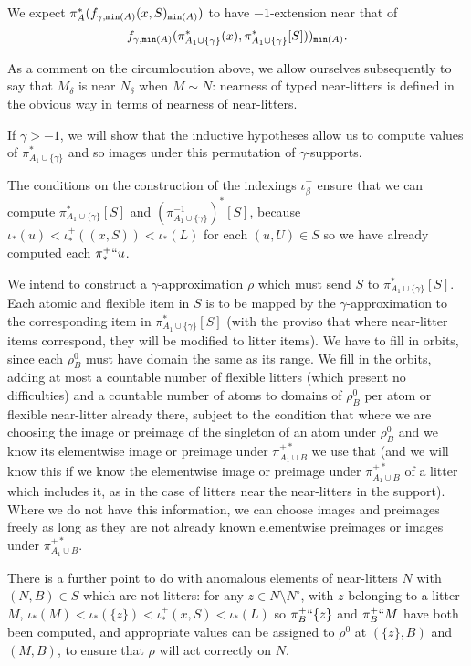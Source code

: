 \documentclass[112pt]{article}
\begin{document}
\begin{description}
We expect $\pi^*_A(f_{\gamma,{\tt min}(A)}(x,S)_{{\tt min}(A)})$ to have $-1$-extension near that of $$f_{ \gamma,{\tt min}(A)}(\pi^*_{A_1\cup \{\gamma\}}(x),\pi^*_{A_1\cup \{\gamma\}}[S]))_{{\tt min}(A)}.$$

As a comment on the circumlocution above, we allow ourselves subsequently to say that $M_\delta$ is near $N_\delta$ when $M \sim N$:  nearness of typed near-litters
is defined in the obvious way in terms of nearness of near-litters.

If $\gamma>-1$, we will show that the inductive hypotheses allow us to compute values of $\pi^*_{A_1\cup \{\gamma\}}$ and so images under this permutation of $\gamma$-supports.

  The conditions on the construction of the indexings
$\iota^+_\beta$ ensure that we can compute $\pi_{A_1 \cup \{\gamma\}}^*[S]$ and $(\pi_{A_1 \cup \{\gamma\}}^{-1})^*[S]$, because $\iota_*(u) < \iota^+_*((x,S))<\iota_*(L)$ for each $(u,U) \in S$ so we have already computed each $\pi_*^+``u$.


We intend to construct a $\gamma$-approximation $\rho$  which must send $S$ to  $\pi_{A_1 \cup \{\gamma\}}^*[S]$.  Each atomic and flexible item in $S$ is to be mapped by the $\gamma$-approximation to the corresponding
item in $\pi_{A_1 \cup \{\gamma\}}^*[S]$ (with the proviso that where near-litter items correspond, they will be modified to litter items).  We have to fill in orbits, since each $\rho^0_B$ must have domain the same as its range.  We fill in the orbits, adding at most a countable number of flexible litters (which present no difficulties) and a countable number of atoms to domains of $\rho^0_B$ per atom or flexible near-litter already there, subject to the condition that where we are choosing the image or preimage of the singleton of an atom under $\rho^0_B$ and we know  its elementwise image or preimage under $\pi_{A_1 \cup B}^{+*}$ we use that (and we will know this if
we know the elementwise image or preimage under $\pi_{A_1 \cup B}^{+*}$ of a litter which includes it, as in the case of litters near the near-litters in the support).  Where we do not have this information, we can choose
images and preimages freely as long as they are not already known elementwise preimages or images under $\pi_{A_1 \cup B}^{+*}$.  

There is a further point to do with anomalous elements of near-litters $N$ with $(N,B) \in S$ which are not litters:  for any $z \in N\setminus N^\circ$, with $z$ belonging to a litter $M$, $\iota_*(M) < \iota_*(\{z\})<\iota_*^+(x,S) < \iota_*(L)$ so $\pi^+_B``\{z\}$ and $\pi^+_B``M$ have both been computed, and appropriate values can be assigned to $\rho^0$ at $(\{z\},B)$ and $(M,B)$, to ensure that $\rho$ will act correctly on $N$.


\end{description}
\end{document}

